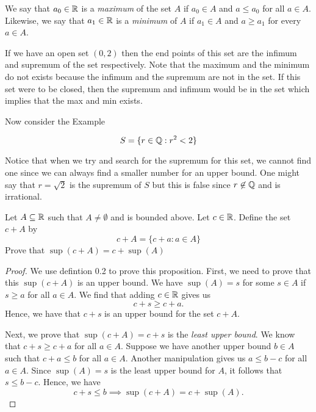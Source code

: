 \begin{definition}    
    We say that \( a_0 \in \mathbb{R} \) is a \textit{maximum} of the set \( A \) if \( a_0 \in A \) and \( a \leq a_0 \) for all \( a \in A \). Likewise, we say that \(a_1 \in \mathbb{R} \) is a \textit{minimum} of \( A \) if \( a_1 \in A \) and \( a \geq a_1 \) for every \( a \in A \).  

    \end{definition}

If we have an open set \( (0,2) \) then the end points of this set are the infimum and supremum of the set respectively. Note that the maximum and the minimum do not exists because the infimum and the supremum are not in the set. If this set were to be closed, then the supremum and infimum would be in the set which implies that the max and min exists. 

Now consider the Example

\[ S = \{ r \in \mathbb{Q}: r^2 < 2 \} \]

Notice that when we try and search for the supremum for this set, we cannot find one since we can always find a smaller number for an upper bound. One might say that \( r = \sqrt{2} \) is the supremum of \( S \) but this is false since \( r \not\in \mathbb{Q} \) and is irrational. 


    Let \( A \subseteq \mathbb{R} \) such that \( A \neq \emptyset \) and is bounded above. Let \( c \in \mathbb{R} \). Define the set 
    \( c + A \) by 
    \[ c + A = \{ c + a: a \in A  \}  \] 
    Prove that \( \sup(c+A) = c + \sup(A) \) 

    \begin{proof}
        We use defintion 0.2 to prove this proposition. First, we need to prove that this \( \sup(c + A) \) is an upper bound. We have \( \sup(A) = s \) for some \( s \in A \) if \( s \geq a \) for all \( a \in A \). We find that adding \( c \in \mathbb{R} \) gives us
        \[  c+s \geq c + a.\]
        Hence, we have that \( c + s \) is an upper bound for the set \( c + A \). 

        Next, we prove that \( \sup(c+ A) = c + s \) is the \textit{least upper bound}. We know that \( c + s \geq c + a \) for all \( a \in A \). Suppose we have another upper bound \( b \in A \) such that \( c + a \leq b \) for all \( a \in A \). Another manipulation gives us \( a \leq b - c \) for all \( a \in A \). Since \( \sup(A) = s \) is the least upper bound for \( A \), it follows that 
        \( s \leq b - c \). Hence, we have 
        \[ c+s \leq b \implies \sup(c+A) = c + \sup(A). \]
    \end{proof}

